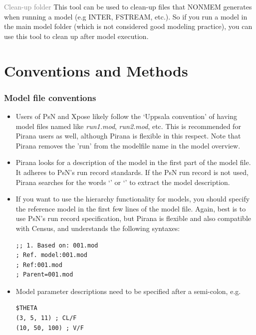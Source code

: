 {{{{\begin {description}
\item{\textcolor{Grey}{Clean-up folder}} This tool can be used to
  clean-up files that NONMEM generates when running a model (e.g
  INTER, FSTREAM, etc.). So if you run a model in the main model
  folder (which is not considered good modeling practice),
  you can use this tool to clean up after model execution.

\end{description}

\clearpage
\section{Conventions and Methods}
\subsubsection{Model file conventions}

\begin{itemize}
\item Users of PsN and Xpose likely follow the `Uppsala convention' of
  having model files named like \textit{run1.mod}, \textit{run2.mod},
  etc. This is recommended for Pirana users as well, although
  Pirana is flexible in this respect. Note that Pirana removes
  the 'run' from the modelfile name in the model overview.
\item Pirana looks for a description of the model in the first part of
  the model file. It adheres to PsN's run record standards.
  If the PsN run record is not used,
  Pirana searches for the words `' \normalfont or
  `' \normalfont to extract the model
  description.
\item If you want to use the hierarchy functionality for models, you
  should specify the reference model in the first few lines of the
  model file. Again, best is to use PsN's run record specification, but
  Pirana is flexible and also compatible with Census, and
  understands the following syntaxes:

\begin{lstlisting}
;; 1. Based on: 001.mod
; Ref. model:001.mod
; Ref:001.mod
; Parent=001.mod
\end{lstlisting}

\item Model parameter descriptions need to be specified
after a semi-colon, e.g.

\begin{lstlisting}
$THETA
(3, 5, 11) ; CL/F
(10, 50, 100) ; V/F
\end{lstlisting}


\end{itemize}}}}}
